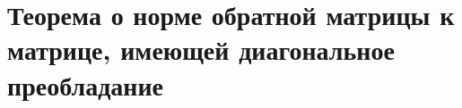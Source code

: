 \documentclass[__main__.tex]{subfiles}
\begin{document}
\section{Теорема о норме обратной матрицы к матрице, имеющей диагональное преобладание}
\end{document}
